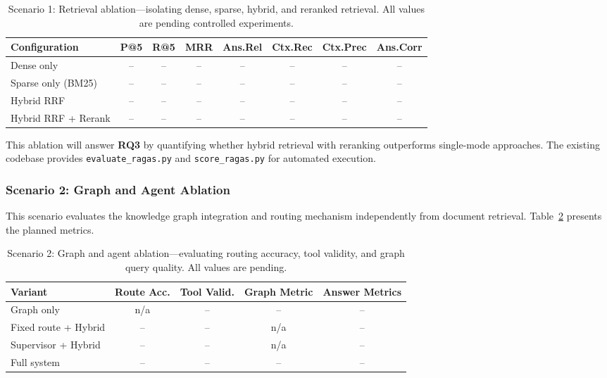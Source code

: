 \documentclass[runningheads]{llncs}
\begin{document}
\begin{table}[t]
\centering
\caption{Scenario 1: Retrieval ablation---isolating dense, sparse, hybrid, and reranked retrieval. All values are pending controlled experiments.}
\label{tab:retrieval}
\small
\begin{tabular}{@{}lccccccc@{}}
\toprule
\textbf{Configuration} & \textbf{P@5} & \textbf{R@5} & \textbf{MRR} & \textbf{Ans.Rel} & \textbf{Ctx.Rec} & \textbf{Ctx.Prec} & \textbf{Ans.Corr} \\
\midrule
Dense only          & -- & -- & -- & -- & -- & -- & -- \\
Sparse only (BM25)  & -- & -- & -- & -- & -- & -- & -- \\
Hybrid RRF          & -- & -- & -- & -- & -- & -- & -- \\
Hybrid RRF + Rerank & -- & -- & -- & -- & -- & -- & -- \\
\bottomrule
\end{tabular}
\end{table}

This ablation will answer \textbf{RQ3} by quantifying whether hybrid retrieval with reranking outperforms single-mode approaches. The existing codebase provides \texttt{evaluate\_ragas.py} and \texttt{score\_ragas.py} for automated execution.

\subsubsection{Scenario 2: Graph and Agent Ablation}
This scenario evaluates the knowledge graph integration and routing mechanism independently from document retrieval. Table~\ref{tab:agent} presents the planned metrics.

\begin{table}[t]
\centering
\caption{Scenario 2: Graph and agent ablation---evaluating routing accuracy, tool validity, and graph query quality. All values are pending.}
\label{tab:agent}
\small
\begin{tabular}{@{}lcccc@{}}
\toprule
\textbf{Variant} & \textbf{Route Acc.} & \textbf{Tool Valid.} & \textbf{Graph Metric} & \textbf{Answer Metrics} \\
\midrule
Graph only          & n/a     & --      & --      & -- \\
Fixed route + Hybrid & --     & --      & n/a     & -- \\
Supervisor + Hybrid  & --     & --      & n/a     & -- \\
Full system          & --     & --      & --      & -- \\
\bottomrule
\end{tabular}
\end{table}
\end{document}
